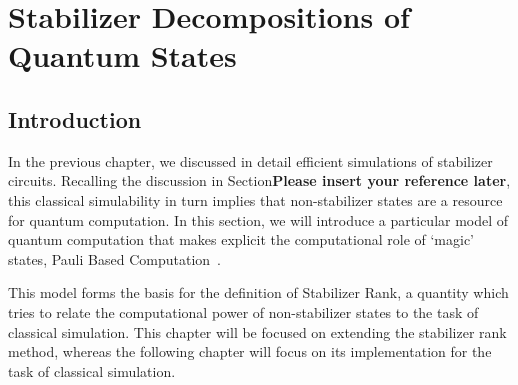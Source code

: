 
\chapter{Stabilizer Decompositions of Quantum States}\label{chap:stabrank}
\section{Introduction}\label{sec:decomposition_intro}
In the previous chapter, we discussed in detail efficient simulations of stabilizer circuits. Recalling the discussion in Section\textbf{Please insert your reference later}, this classical simulability in turn implies that non-stabilizer states are a resource for quantum computation. In this section, we will introduce a particular model of quantum computation that makes explicit the computational role of `magic' states, Pauli Based Computation~\cite{Bravyi2015,Yoganathan2019}.\par
This model forms the basis for the definition of Stabilizer Rank, a quantity which tries to relate the computational power of non-stabilizer states to the task of classical simulation. This chapter will be focused on extending the stabilizer rank method, whereas the following chapter will focus on its implementation for the task of classical simulation.
